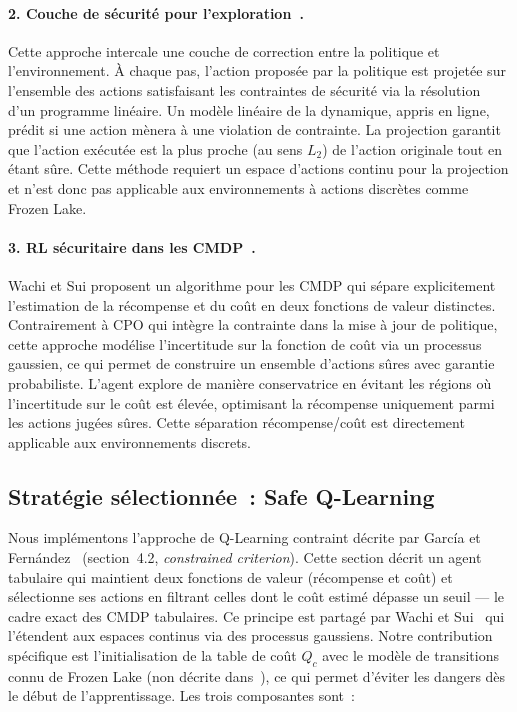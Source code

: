 \documentclass{article}
\begin{document}
\paragraph{2. Couche de sécurité pour l'exploration~\cite{dalal2018safe}.} Cette approche intercale une couche de correction entre la politique et l'environnement. À chaque pas, l'action proposée par la politique est projetée sur l'ensemble des actions satisfaisant les contraintes de sécurité via la résolution d'un programme linéaire. Un modèle linéaire de la dynamique, appris en ligne, prédit si une action mènera à une violation de contrainte. La projection garantit que l'action exécutée est la plus proche (au sens $L_2$) de l'action originale tout en étant sûre. Cette méthode requiert un espace d'actions continu pour la projection et n'est donc pas applicable aux environnements à actions discrètes comme Frozen Lake.

\paragraph{3. RL sécuritaire dans les CMDP~\cite{wachi2020safe}.} Wachi et Sui proposent un algorithme pour les CMDP qui sépare explicitement l'estimation de la récompense et du coût en deux fonctions de valeur distinctes. Contrairement à CPO qui intègre la contrainte dans la mise à jour de politique, cette approche modélise l'incertitude sur la fonction de coût via un processus gaussien, ce qui permet de construire un ensemble d'actions sûres avec garantie probabiliste. L'agent explore de manière conservatrice en évitant les régions où l'incertitude sur le coût est élevée, optimisant la récompense uniquement parmi les actions jugées sûres. Cette séparation récompense/coût est directement applicable aux environnements discrets.

\subsection{Stratégie sélectionnée~: Safe Q-Learning}

Nous implémentons l'approche de Q-Learning contraint décrite par García et Fernández~\cite{garcia2015comprehensive} (section~4.2, \textit{constrained criterion}). Cette section décrit un agent tabulaire qui maintient deux fonctions de valeur (récompense et coût) et sélectionne ses actions en filtrant celles dont le coût estimé dépasse un seuil — le cadre exact des CMDP tabulaires. Ce principe est partagé par Wachi et Sui~\cite{wachi2020safe} qui l'étendent aux espaces continus via des processus gaussiens. Notre contribution spécifique est l'initialisation de la table de coût $Q_c$ avec le modèle de transitions connu de Frozen Lake (non décrite dans~\cite{garcia2015comprehensive}), ce qui permet d'éviter les dangers dès le début de l'apprentissage. Les trois composantes sont~:
\end{document}
